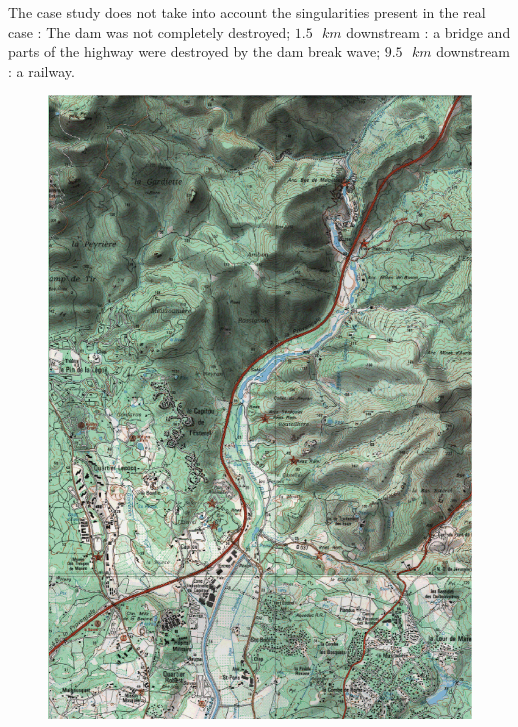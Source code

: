 \documentclass[a4paper,12pt]{article}
\begin{document}
\vspace{0.5cm}

The case study does not take into account the singularities present
in the real case : The dam was not completely destroyed; $1.5\mbox{ }km$ downstream
: a bridge and parts of the highway were destroyed by the dam break
wave; $9.5\mbox{ }km$ downstream : a railway.




\newpage
{}
\begin{figure}[h]
  \begin{center}
  \includegraphics[scale=0.6]{carte1}
  \caption{}
  \label{fig:carte1}
  \end{center}
\end{figure}
\end{document}
